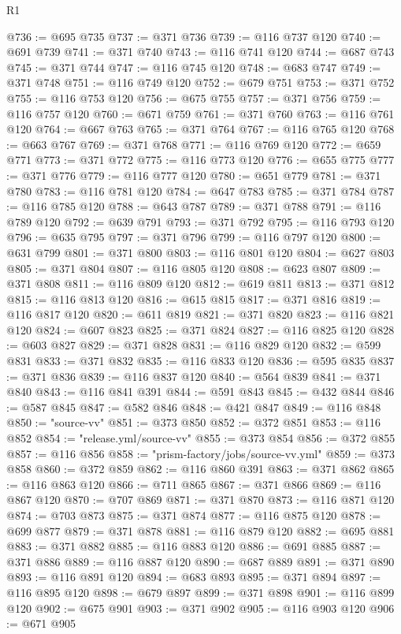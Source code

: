 \begin{lexlean}{R1}
\begin{coremodule}
@736 := @695 @735
@737 := @371 @736
@739 := @116 @737 @120
@740 := @691 @739
@741 := @371 @740
@743 := @116 @741 @120
@744 := @687 @743
@745 := @371 @744
@747 := @116 @745 @120
@748 := @683 @747
@749 := @371 @748
@751 := @116 @749 @120
@752 := @679 @751
@753 := @371 @752
@755 := @116 @753 @120
@756 := @675 @755
@757 := @371 @756
@759 := @116 @757 @120
@760 := @671 @759
@761 := @371 @760
@763 := @116 @761 @120
@764 := @667 @763
@765 := @371 @764
@767 := @116 @765 @120
@768 := @663 @767
@769 := @371 @768
@771 := @116 @769 @120
@772 := @659 @771
@773 := @371 @772
@775 := @116 @773 @120
@776 := @655 @775
@777 := @371 @776
@779 := @116 @777 @120
@780 := @651 @779
@781 := @371 @780
@783 := @116 @781 @120
@784 := @647 @783
@785 := @371 @784
@787 := @116 @785 @120
@788 := @643 @787
@789 := @371 @788
@791 := @116 @789 @120
@792 := @639 @791
@793 := @371 @792
@795 := @116 @793 @120
@796 := @635 @795
@797 := @371 @796
@799 := @116 @797 @120
@800 := @631 @799
@801 := @371 @800
@803 := @116 @801 @120
@804 := @627 @803
@805 := @371 @804
@807 := @116 @805 @120
@808 := @623 @807
@809 := @371 @808
@811 := @116 @809 @120
@812 := @619 @811
@813 := @371 @812
@815 := @116 @813 @120
@816 := @615 @815
@817 := @371 @816
@819 := @116 @817 @120
@820 := @611 @819
@821 := @371 @820
@823 := @116 @821 @120
@824 := @607 @823
@825 := @371 @824
@827 := @116 @825 @120
@828 := @603 @827
@829 := @371 @828
@831 := @116 @829 @120
@832 := @599 @831
@833 := @371 @832
@835 := @116 @833 @120
@836 := @595 @835
@837 := @371 @836
@839 := @116 @837 @120
@840 := @564 @839
@841 := @371 @840
@843 := @116 @841 @391
@844 := @591 @843
@845 := @432 @844
@846 := @587 @845
@847 := @582 @846
@848 := @421 @847
@849 := @116 @848
@850 := "source-vv"
@851 := @373 @850
@852 := @372 @851
@853 := @116 @852
@854 := "release.yml/source-vv"
@855 := @373 @854
@856 := @372 @855
@857 := @116 @856
@858 := "prism-factory/jobs/source-vv.yml"
@859 := @373 @858
@860 := @372 @859
@862 := @116 @860 @391
@863 := @371 @862
@865 := @116 @863 @120
@866 := @711 @865
@867 := @371 @866
@869 := @116 @867 @120
@870 := @707 @869
@871 := @371 @870
@873 := @116 @871 @120
@874 := @703 @873
@875 := @371 @874
@877 := @116 @875 @120
@878 := @699 @877
@879 := @371 @878
@881 := @116 @879 @120
@882 := @695 @881
@883 := @371 @882
@885 := @116 @883 @120
@886 := @691 @885
@887 := @371 @886
@889 := @116 @887 @120
@890 := @687 @889
@891 := @371 @890
@893 := @116 @891 @120
@894 := @683 @893
@895 := @371 @894
@897 := @116 @895 @120
@898 := @679 @897
@899 := @371 @898
@901 := @116 @899 @120
@902 := @675 @901
@903 := @371 @902
@905 := @116 @903 @120
@906 := @671 @905

\end{coremodule}
\end{lexlean}
